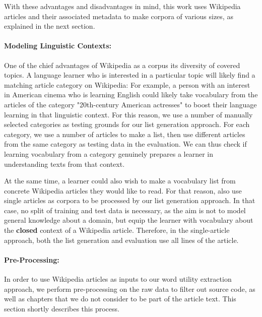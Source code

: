With these advantages and disadvantages in mind, this work uses Wikipedia articles and their associated metadata to make corpora of various sizes, as explained in the next section.

\paragraph{Modeling Linguistic Contexts:}

One of the chief advantages of Wikipedia as a corpus its diversity of covered topics.
A language learner who is interested in a particular topic will likely find a matching article category on Wikipedia:
For example, a person with an interest in American cinema who is learning English could likely take vocabulary from the articles of the category "20th-century American actresses" to boost their language learning in that linguistic context.
For this reason, we use a number of manually selected categories as testing grounds for our list generation approach.
For each category, we use a number of articles to make a list, then use different articles from the same category as testing data in the evaluation.
We can thus check if learning vocabulary from a category genuinely prepares a learner in understanding texts from that context.

At the same time, a learner could also wish to make a vocabulary list from concrete Wikipedia articles they would like to read.
For that reason, also use single articles as corpora to be processed by our list generation approach.
In that case, no split of training and test data is necessary, as the aim is not to model general knowledge about a domain, but equip the learner with vocabulary about the \textbf{closed} context of a Wikipedia article.
Therefore, in the single-article approach, both the list generation and evaluation use all lines of the article.




\paragraph{Pre-Processing:}
In order to use Wikipedia articles as inputs to our word utility extraction approach, we perform pre-processing on the raw data to filter out source code, as well as chapters that we do not consider to be part of the article text.
This section shortly describes this process.

